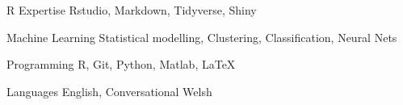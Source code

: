 

\begin{cvskills}
  \cvskill
    {R Expertise} %
    {Rstudio, Markdown, Tidyverse, Shiny} %

  \cvskill
    {Machine Learning} %
    {Statistical modelling, Clustering, Classification, Neural Nets} %

  \cvskill
    {Programming} %
    {R, Git, Python, Matlab, \LaTeX} %

  \cvskill
    {Languages} %
    {English, Conversational Welsh} %

\end{cvskills}